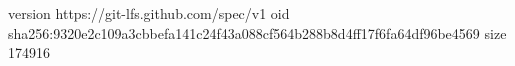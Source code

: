 version https://git-lfs.github.com/spec/v1
oid sha256:9320e2c109a3cbbefa141c24f43a088cf564b288b8d4ff17f6fa64df96be4569
size 174916
